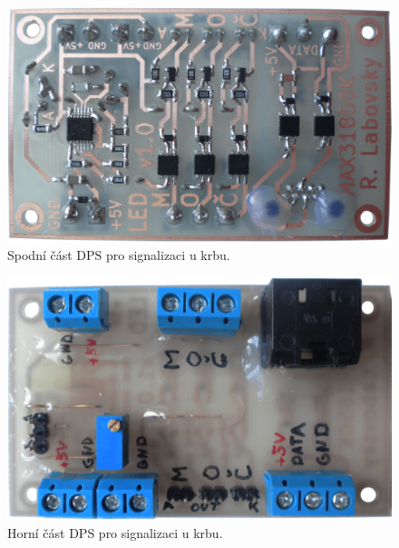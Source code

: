 \begin{figure}[H]
    \centering
    \includegraphics[width=\textwidth]{images/krb/dps-led-ochrany-u-krbu-spodek.png}
    \caption{Spodní část DPS pro signalizaci u krbu.}
    \label{fig:dps-led-ochrany-u-krbu-spodek}
\end{figure}

\begin{figure}[H]
    \centering
    \includegraphics[width=\textwidth]{images/krb/dps-led-ochrany-u-krbu-vrsek.png}
    \caption{Horní část DPS pro signalizaci u krbu.}
    \label{fig:dps-led-ochrany-u-krbu-vrsek}
\end{figure}


